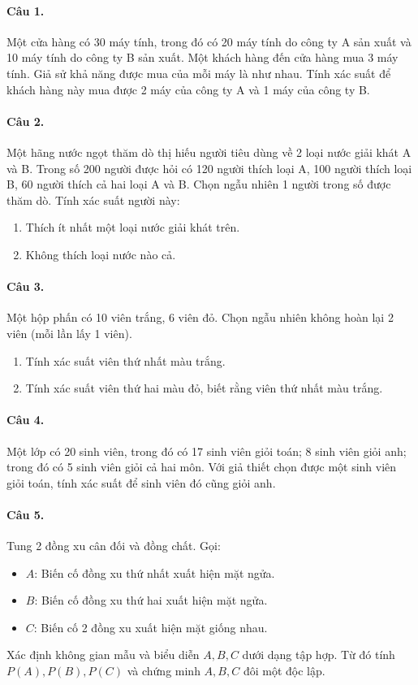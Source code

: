 \paragraph{Câu 1.} Một cửa hàng có 30 máy tính, trong đó có 20 máy tính do công ty A sản xuất và 10 máy tính do công ty B sản xuất. Một khách hàng đến cửa hàng mua 3 máy tính. Giả sử khả năng được mua của mỗi máy là như nhau. Tính xác suất để khách hàng này mua được 2 máy của công ty A và 1 máy của công ty B.

\paragraph{Câu 2.} Một hãng nước ngọt thăm dò thị hiếu người tiêu dùng về 2 loại nước giải khát A và B. Trong số 200 người được hỏi có 120 người thích loại A, 100 người thích loại B, 60 người thích cả hai loại A và B. Chọn ngẫu nhiên 1 người trong số được thăm dò. Tính xác suất người này:
\begin{enumerate}[label=\arabic*.]
    \item Thích ít nhất một loại nước giải khát trên.
    \item Không thích loại nước nào cả.
\end{enumerate}

\paragraph{Câu 3.} Một hộp phấn có 10 viên trắng, 6 viên đỏ. Chọn ngẫu nhiên không hoàn lại 2 viên (mỗi lần lấy 1 viên).
\begin{enumerate}[label=\arabic*.]
    \item Tính xác suất viên thứ nhất màu trắng.
    \item Tính xác suất viên thứ hai màu đỏ, biết rằng viên thứ nhất màu trắng.
\end{enumerate}

\paragraph{Câu 4.} Một lớp có 20 sinh viên, trong đó có 17 sinh viên giỏi toán; 8 sinh viên giỏi anh; trong đó có 5 sinh viên giỏi cả hai môn. Với giả thiết chọn được một sinh viên giỏi toán, tính xác suất để sinh viên đó cũng giỏi anh.

\paragraph{Câu 5.} Tung 2 đồng xu cân đối và đồng chất. Gọi:
\begin{itemize}
    \item $A$: Biến cố đồng xu thứ nhất xuất hiện mặt ngửa.
    \item $B$: Biến cố đồng xu thứ hai xuất hiện mặt ngửa.
    \item $C$: Biến cố 2 đồng xu xuất hiện mặt giống nhau.
\end{itemize}
Xác định không gian mẫu và biểu diễn $A, B, C$ dưới dạng tập hợp. Từ đó tính $P(A), P(B), P(C)$ và chứng minh $A, B, C$ đôi một độc lập.

